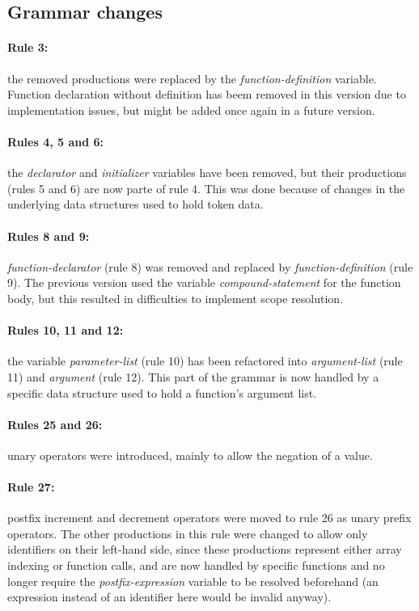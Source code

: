 \documentclass[12pt]{article}
\begin{document}
\normalsize

\subsection{Grammar changes}
\paragraph{Rule 3:} the removed productions were replaced by the \textit{function-definition} variable.
Function declaration without definition has beem removed in this version due to implementation issues,
but might be added once again in a future version.

\paragraph{Rules 4, 5 and 6:} the \textit{declarator} and \textit{initializer} variables have been
removed, but their productions (rules 5 and 6) are now parte of rule 4. This was done because
of changes in the underlying data structures used to hold token data.

\paragraph{Rules 8 and 9:} \textit{function-declarator} (rule 8) was removed and replaced by
\textit{function-definition} (rule 9). The previous version used the variable
\textit{compound-statement} for the function body, but this resulted in difficulties
to implement scope resolution.

\paragraph{Rules 10, 11 and 12:} the variable \textit{parameter-list} (rule 10) has been
refactored into \textit{argument-list} (rule 11) and \textit{argument} (rule 12). This part of
the grammar is now handled by a specific data structure used to hold a function's argument list.

\paragraph{Rules 25 and 26:} unary operators were introduced, mainly to allow the negation
of a value.

\paragraph{Rule 27:} postfix increment and decrement operators were moved to rule 26 as unary prefix
operators. The other productions in this rule were changed to allow only identifiers on their left-hand
side, since these productions represent either array indexing or function calls, and are now handled
by specific functions and no longer require the \textit{postfix-expression} variable to be resolved
beforehand (an expression instead of an identifier here would be invalid anyway).
\end{document}
